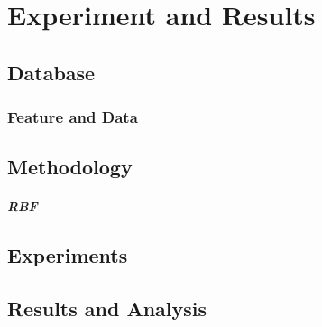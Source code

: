 \chapter{Experiment and Results}
\section{Database}
\subsection{Feature and Data}
\section{Methodology}
\paragraph{RBF}
\section{Experiments}
\section{Results and Analysis}